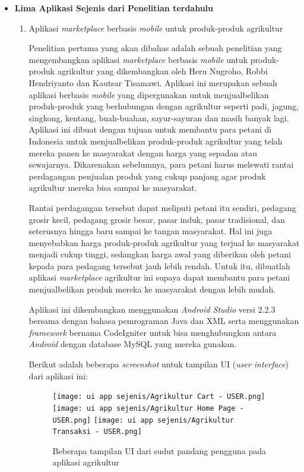 \documentclass[a4paper]{article}
\begin{document}
\begin{itemize}
    \item \textbf{Lima Aplikasi Sejenis dari Penelitian terdahulu}
    
    \begin{enumerate}
        \item Aplikasi \textit{marketplace} berbasis \textit{mobile} untuk produk-produk agrikultur
    
        Penelitian pertama yang akan dibahas adalah sebuah penelitian yang mengembangkan aplikasi \textit{marketplace} berbasis \textit{mobile} untuk produk-produk agrikultur yang dikembangkan oleh Heru Nugroho, Robbi Hendriyanto dan Kautsar Tisamawi. Aplikasi ini merupakan sebuah aplikasi berbasis \textit{mobile} yang dipergunakan untuk menjualbelikan produk-produk yang berhubungan dengan agrikultur seperti padi, jagung, singkong, kentang, buah-buahan, sayur-sayuran dan masih banyak lagi. Aplikasi ini dibuat dengan tujuan untuk membantu para petani di Indonesia untuk menjualbelikan produk-produk agrikultur yang telah mereka panen ke masyarakat dengan harga yang sepadan atau sewajarnya. Dikarenakan sebelumnya, para petani harus melewati rantai perdagangan penjualan produk yang cukup panjang agar produk agrikultur mereka bisa sampai ke masyarakat\autocite{agriculture-marketplace}.
    
        Rantai perdagangan tersebut dapat meliputi petani itu sendiri, pedagang grosir kecil, pedagang grosir besar, pasar induk, pasar tradisional, dan seterusnya hingga baru sampai ke tangan masyarakat. Hal ini juga menyebabkan harga produk-produk agrikultur yang terjual ke masyarakat menjadi cukup tinggi, sedangkan harga awal yang diberikan oleh petani kepada para pedagang tersebut jauh lebih rendah. Untuk itu, dibuatlah aplikasi \textit{marketplace} agrikultur ini supaya dapat membantu para petani menjualbelikan produk mereka ke masyarakat dengan lebih mudah\autocite{agriculture-marketplace}.
    
        Aplikasi ini dikembangkan menggunakan \textit{Android Studio} versi 2.2.3 bersama dengan bahasa pemrograman Java dan XML serta menggunakan \textit{framework} bernama CodeIgniter untuk bisa menghubungkan antara \textit{Android} dengan database MySQL yang mereka gunakan\autocite{agriculture-marketplace}.
    
        \newpage
        Berikut adalah beberapa \textit{screenshot} untuk tampilan UI (\textit{user interface}) dari aplikasi ini:
        \begin{figure}[h]
            \centering
            \texttt{[image: ui app sejenis/Agrikultur Cart - USER.png]}\hfill
            \texttt{[image: ui app sejenis/Agrikultur Home Page - USER.png]}\hfill
            \texttt{[image: ui app sejenis/Agrikultur Transaksi - USER.png]}
            \caption{Beberapa tampilan UI dari sudut pandang pengguna pada aplikasi agrikultur}
        \end{figure}
    

\end{enumerate}
\end{itemize}
\end{document}
